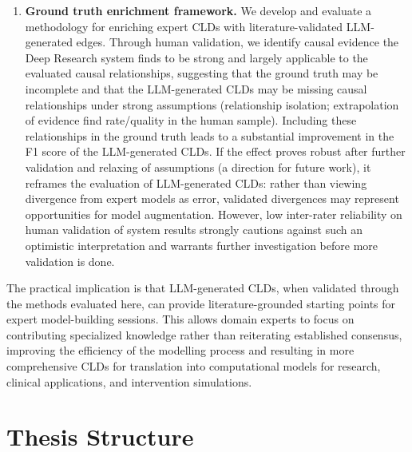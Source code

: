 \begin{enumerate}
    \item \textbf{Ground truth enrichment framework.} We develop and evaluate a methodology for enriching expert CLDs with literature-validated LLM-generated edges. Through human validation, we identify causal evidence the Deep Research system finds to be strong and largely applicable to the evaluated causal relationships, suggesting that the ground truth may be incomplete and that the LLM-generated CLDs may be missing causal relationships under strong assumptions (relationship isolation; extrapolation of evidence find rate/quality in the human sample). Including these relationships in the ground truth leads to a substantial improvement in the F1 score of the LLM-generated CLDs. If the effect proves robust after further validation and relaxing of assumptions (a direction for future work), it reframes the evaluation of LLM-generated CLDs: rather than viewing divergence from expert models as error, validated divergences may represent opportunities for model augmentation. However, low inter-rater reliability on human validation of system results strongly cautions against such an optimistic interpretation and warrants further investigation before more validation is done.
\end{enumerate}

The practical implication is that LLM-generated CLDs, when validated through the methods evaluated here, can provide literature-grounded starting points for expert model-building sessions. This allows domain experts to focus on contributing specialized knowledge rather than reiterating established consensus, improving the efficiency of the modelling process and resulting in more comprehensive CLDs for translation into computational models for research, clinical applications, and intervention simulations.

\section*{Thesis Structure}

